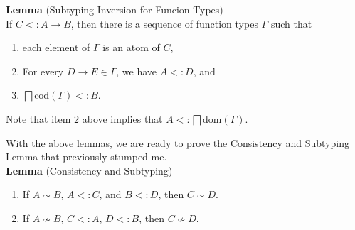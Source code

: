 \documentclass{article}
\begin{document}
\noindent \textbf{Lemma} (Subtyping Inversion for Funcion Types)\\
%
If $C <: A \to B$, then there is a sequence of function types $\Gamma$
such that
\begin{enumerate}
\item each element of $\Gamma$ is an atom of $C$,
\item For every $D\to E \in \Gamma$, we have $A <: D$, and
\item $\bigsqcap \mathrm{cod}(\Gamma) <: B$.
\end{enumerate}
Note that item 2 above implies that $A <: \bigsqcap \mathrm{dom}(\Gamma)$.

With the above lemmas, we are ready to prove the Consistency and
Subtyping Lemma that previously stumped me.\\

\noindent \textbf{Lemma} (Consistency and Subtyping)
\begin{enumerate}
\item  If $A \sim B$, $A <: C$, and $B <: D$,
  then $C \sim D$.
\item If $A \not\sim B$, $C <: A$, $D <: B$, then $C \not\sim D$.
\end{enumerate}
\end{document}
